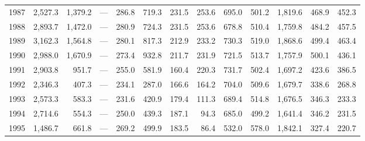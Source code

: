 \begin{longtable}{rrrrrrrrrrrrr}
1987 & 2,527.3 & 1,379.2 & --- & 286.8 & 719.3 & 231.5 & 253.6 & 695.0 & 501.2 & 1,819.6 & 468.9 & 452.3 \\
1988 & 2,893.7 & 1,472.0 & --- & 280.9 & 724.3 & 231.5 & 253.6 & 678.8 & 510.4 & 1,759.8 & 484.2 & 457.5 \\
1989 & 3,162.3 & 1,564.8 & --- & 280.1 & 817.3 & 212.9 & 233.2 & 730.3 & 519.0 & 1,868.6 & 499.4 & 463.4 \\
1990 & 2,988.0 & 1,670.9 & --- & 273.4 & 932.8 & 211.7 & 231.9 & 721.5 & 513.7 & 1,757.9 & 500.1 & 436.1 \\
1991 & 2,903.8 & 951.7 & --- & 255.0 & 581.9 & 160.4 & 220.3 & 731.7 & 502.4 & 1,697.2 & 423.6 & 386.5 \\
1992 & 2,346.3 & 407.3 & --- & 234.1 & 287.0 & 166.6 & 164.2 & 704.0 & 509.6 & 1,679.7 & 338.6 & 268.8 \\
1993 & 2,573.3 & 583.3 & --- & 231.6 & 420.9 & 179.4 & 111.3 & 689.4 & 514.8 & 1,676.5 & 346.3 & 233.3 \\
1994 & 2,714.6 & 554.3 & --- & 250.0 & 439.3 & 187.1 & 94.3 & 685.0 & 499.2 & 1,641.4 & 346.2 & 231.5 \\
1995 & 1,486.7 & 661.8 & --- & 269.2 & 499.9 & 183.5 & 86.4 & 532.0 & 578.0 & 1,842.1 & 327.4 & 220.7 \\
\end{longtable}
\endgroup
